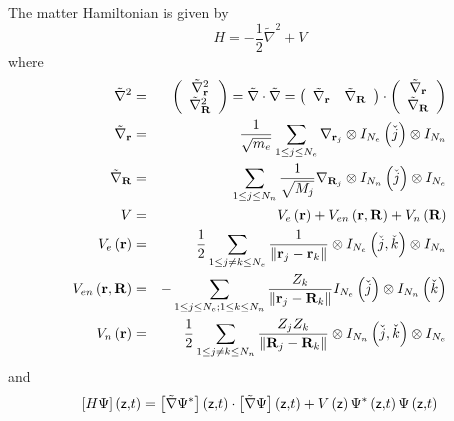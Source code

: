 The matter Hamiltonian is given by 
\begin{equation}
H=-\frac{1}{2}\tilde{\nabla}^{2}+V
\end{equation}%
where 
\begin{eqnarray}
\tilde{\nabla}^{2} &=&\left( 
\begin{array}{c}
\tilde{\nabla}_{{\bf r}}^{2} \\ 
\tilde{\nabla}_{{\bf R}}^{2}%
\end{array}%
\right) =\tilde{\nabla}\cdot \tilde{\nabla}=\left( 
\begin{array}{cc}
\tilde{\nabla}_{{\bf r}} & \tilde{\nabla}_{{\bf R}}%
\end{array}%
\right) \cdot \left( 
\begin{array}{c}
\tilde{\nabla}_{{\bf r}} \\ 
\tilde{\nabla}_{{\bf R}}%
\end{array}%
\right) \\
\tilde{\nabla}_{{\bf r}} &=&\frac{1}{\sqrt{m_{e}}}\sum_{1\leq j\leq
N_{e}}\nabla _{{\bf r}_{j}}\otimes I_{N_{e}}\left( \check{j}\right) \otimes
I_{N_{n}} \\
\tilde{\nabla}_{{\bf R}} &=&\sum_{1\leq j\leq N_{n}}\frac{1}{\sqrt{M_{j}}}%
\nabla _{{\bf R}_{j}}\otimes I_{N_{n}}\left( \check{j}\right) \otimes
I_{N_{e}} \\
V &=&V_{e}\left( {\bf r}\right) +V_{en}\left( {\bf r,R}\right) +V_{n}\left( 
{\bf R}\right) \\
V_{e}\left( {\bf r}\right) &=&\frac{1}{2}\sum_{1\leq j\neq k\leq N_{e}}\frac{%
1}{\left\| {\bf r}_{j}-{\bf r}_{k}\right\| }\otimes I_{N_{e}}\left( \check{j}%
,\check{k}\right) \otimes I_{N_{n}} \\
V_{en}\left( {\bf r,R}\right) &=&-\sum_{1\leq j\leq N_{e};1\leq k\leq N_{n}}%
\frac{Z_{k}}{\left\| {\bf r}_{j}-{\bf R}_{k}\right\| }I_{N_{e}}\left( \check{%
j}\right) \otimes I_{N_{n}}\left( \check{k}\right) \\
V_{n}\left( {\bf r}\right) &=&\frac{1}{2}\sum_{1\leq j\neq k\leq N_{n}}\frac{%
Z_{j}Z_{k}}{\left\| {\bf R}_{j}-{\bf R}_{k}\right\| }\otimes I_{N_{n}}\left( 
\check{j},\check{k}\right) \otimes I_{N_{e}}
\end{eqnarray}%
and 
\begin{equation}
\left[ H\Psi \right] \left( {\sf z,}t\right) =\left[ \tilde{\nabla}\Psi
^{\ast }\right] \left( {\sf z,}t\right) \cdot \left[ \tilde{\nabla}\Psi %
\right] \left( {\sf z,}t\right) +V\left( {\sf z}\right) \Psi ^{\ast }\left( 
{\sf z,}t\right) \Psi \left( {\sf z,}t\right)
\end{equation}

